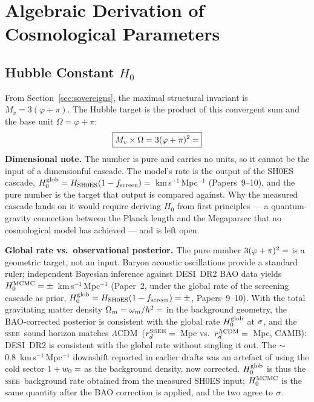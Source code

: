 \documentclass[12pt,a4paper]{article}
\newcommand{\SSEE}{\ifmmode\mathrm{SSEE}\else\textsc{ssee}\fi}
\newcommand{\LCDM}{\ifmmode\Lambda\mathrm{CDM}\else$\Lambda$CDM\fi}
\begin{document}
\section{Algebraic Derivation of Cosmological Parameters}
\label{sec:derivations}

\subsection{Hubble Constant \texorpdfstring{$H_0$}{H0}}
\label{sec:h0}

From Section~\ref{sec:sovereigns}, the maximal structural invariant is $M_v = 3(\varphi+\pi)$.
The Hubble target is the product of this convergent sum and the base unit
$\Omega = \varphi+\pi$:
\begin{equation}
\boxed{M_v \times \Omega = 3(\varphi+\pi)^2 = \val{H0_ALG_d6}}
\label{eq:H0}
\end{equation}
\textbf{Dimensional note.} The number  is pure and carries no units,
so it cannot be the input of a dimensionful cascade. The model's rate is the
output of the SH0ES cascade, $H_0^{\rm glob}=H_{\rm SH0ES}(1-f_{\rm screen})=\val{H0_GLOBAL_d6}$~km\,s$^{-1}$\,Mpc$^{-1}$
(Papers~9--10), and the pure number is the target that output is compared
against. Why the measured cascade lands on it would require deriving $H_0$
from first principles --- a quantum-gravity connection between the Planck length
and the Megaparsec that no cosmological model has achieved --- and is left open.

\textbf{Global rate vs.\ observational posterior.}
The pure number $3(\varphi+\pi)^2=\val{H0_ALG_d6}$ is a geometric target, not an input.
Baryon acoustic oscillations \citep{Eisenstein2005} provide a standard ruler;
independent Bayesian inference against DESI~DR2 BAO data \citep{desidr2_2025} yields
$H_0^{\rm MCMC}=\val{h0_p2}\pm\val{h0_p2_s}$~km\,s$^{-1}$\,Mpc$^{-1}$ (Paper~2, under
the global rate of the screening cascade as prior, $H_0^{\rm glob}=H_{\rm SH0ES}(1-f_{\rm screen})=\val{H0_GLOBAL_d3}\pm\val{p9_hglob_sigma}$, Papers~9--10).
With the total gravitating matter density $\Omega_m=\omega_m/h^2=\val{OMEGA_M_TOTAL_d6}$ in the
background geometry, the BAO-corrected posterior is consistent with the global
rate $H_0^{\rm glob}$ at $\val{h0_p2_dhglob}\sigma$, and the \SSEE\ sound horizon matches \LCDM\
($r_d^{\rm SSEE}=\val{p2_lyaB_rd}$~Mpc vs.\ $r_d^{\rm \Lambda CDM}=\val{p2_rd_lcdm}$~Mpc, CAMB): DESI~DR2
is consistent with the global rate without singling it out. The $\sim$0.8~km\,s$^{-1}$\,Mpc$^{-1}$ downshift
reported in earlier drafts was an artefact of using the cold sector
$1+w_0=\val{S_M_d6}$ as the background density, now corrected.
$H_0^{\rm glob}$ is thus the \SSEE\ background rate obtained from the measured
SH0ES input; $H_0^{\rm MCMC}$ is the same quantity after the BAO correction is
applied, and the two agree to $\val{h0_p2_dhglob}\sigma$.
\end{document}
